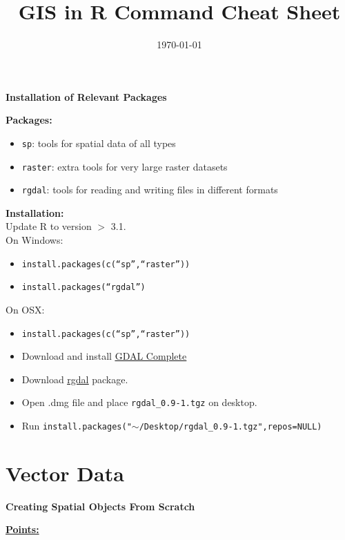 \documentclass[10pt]{article}
\title{GIS in R Command Cheat Sheet}
\date{\today}
\begin{document}
 
\maketitle

	
\centerline{\textbf{Installation of Relevant Packages}}
\textbf{Packages:}
\begin{itemize}
	\item \texttt{sp}: tools for spatial data of all types
	\item \texttt{raster}: extra tools for very large raster datasets
	\item \texttt{rgdal}: tools for reading and writing files in different formats
\end{itemize}
\textbf{Installation:}\\
Update R to version $>$ 3.1.\\
On Windows:
\begin{itemize}
	\item \texttt{install.packages(c(``sp'',``raster''))}
	\item \texttt{install.packages(``rgdal'')}
\end{itemize}
On OSX:
	\begin{itemize}
		\item \texttt{install.packages(c(``sp'',``raster''))}
		\item Download and install 	\href{http://www.kyngchaos.com/files/software/frameworks/GDAL_Complete-1.11.dmg}{\underline{GDAL Complete}}
		\item Download \href{http://www.kyngchaos.com/files/software/frameworks/rgdal-0.9.1-1.dmg}{\underline{rgdal}} package. 
		\item Open .dmg file and place \texttt{rgdal\_0.9-1.tgz} on desktop.
		\item Run \texttt{install.packages("$\sim$/Desktop/rgdal\_0.9-1.tgz",repos=NULL)}
	\end{itemize}



\section*{Vector Data}


\centerline{\textbf{Creating Spatial Objects From Scratch}} 
\underline{\textbf{Points:}}\\
\end{document}
